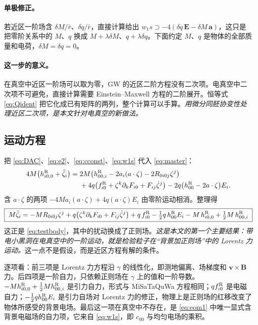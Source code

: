 \documentclass[11pt,a4paper]{ctexart}
\begin{document}
\paragraph{单极修正。}若近区一阶场含 $\delta M/\bar r$、$\delta q/\bar r$，直接计算给出 $w_1s\supset-4(\delta q\,\boldsymbol E-\delta M\,\boldsymbol a)$，这只是把零阶关系中的 $M$、$q$ 换成 $M+\lambda\delta M$、$q+\lambda\delta q$。下面约定 $M$、$q$ 是物体的全部质量和电荷，$\delta M=\delta q=0$。

\paragraph{这一步的意义。}在真空中近区一阶场可以取为零，GW 的近区二阶方程没有二次项。电真空中二次项不可避免，直接计算需要 Einstein--Maxwell 方程的二阶展开。恒等式 \eqref{eq:Qident} 把它化成已有矩阵的两列，整个计算可以手算。\emph{用微分同胚协变性处理近区二次项，是本文针对电真空的新做法。}

\subsection{运动方程}\label{sec:first-eom}

把 \eqref{eq:DAC}、\eqref{eq:e2}、\eqref{eq:cconst}、\eqref{eq:w1s} 代入 \eqref{eq:master}：
\begin{equation*}
\begin{split}
4M\big(h^{\rm R}_{i0,0}+\ddot\zeta_i\big)={}&2M\big(h^{\rm R}_{00,i}-2a_i(a\cdot\zeta)-2R_{0i0j}\zeta^j\big)\\
&+4q\big(f^{\rm R}_{i0}+\zeta^k\partial_kF_{i0}+F_{ij}\dot\zeta^j\big)-2q\big(h^{\rm R}_{00}-2a\cdot\zeta\big)E_i .
\end{split}
\end{equation*}
含 $a\cdot\zeta$ 的两项 $-4Ma_i(a\cdot\zeta)+4q(a\cdot\zeta)E_i$ 由零阶运动相消。整理得
\begin{equation}
\boxed{\;
M\ddot\zeta_i=-MR_{0i0j}\zeta^j+q\big(\zeta^k\partial_kF_{i0}+F_{ij}\dot\zeta^j\big)
+q\,f^{\rm R}_{i0}-\tfrac12q\,h^{\rm R}_{00}E_i-M\,h^{\rm R}_{i0,0}+\tfrac12M\,h^{\rm R}_{00,i}\;}
\label{eq:eom1}
\end{equation}
这正是 \eqref{eq:testbody}，其中的扰动换成了正则场。\emph{这是本文的第一个主要结果：带电小黑洞在电真空中的一阶运动，就是检验粒子在“背景加正则场”中的 Lorentz 力运动。}这一点不是假设，而是近区方程有解的条件。

逐项看：前三项是 Lorentz 力方程沿 $\gamma$ 的线性化，即测地偏离、场梯度和 $\boldsymbol v\times\boldsymbol B$ 力。后四项是一阶自力，只依赖正则场在 $\gamma$ 上的值和一阶导数。$-M h^{\rm R}_{i0,0}+\tfrac12Mh^{\rm R}_{00,i}$ 是引力自力，形式与 MiSaTaQuWa 方程相同；$q f^{\rm R}_{i0}$ 是电磁自力；$-\tfrac12qh^{\rm R}_{00}E_i$ 是引力自场对 Lorentz 力的修正，物理上是正则场的红移改变了物体所感受的背景电场。最后这一项在真空中不存在，是 \eqref{eq:eom1} 中唯一显式含背景电磁场的自力项，它来自 \eqref{eq:w1s}，即 $c_{00}$ 与均匀电场的乘积。
\end{document}

